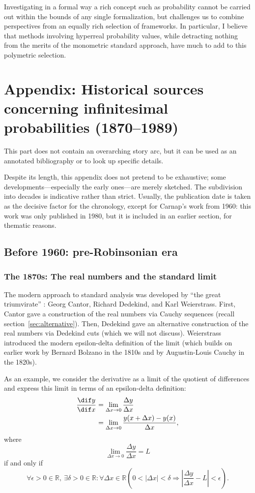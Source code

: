 Investigating in a formal way a rich concept such as probability cannot be carried out within the bounds of any single formalization, but challenges us to combine perspectives from an equally rich selection of frameworks. In particular, I believe that methods involving hyperreal probability values, while detracting nothing from the merits of the monometric standard approach, have much to add to this polymetric selection.


\section[Appendix: Historical Sources]{Appendix: Historical sources concerning infinitesimal probabilities (1870--1989)}
This part does not contain an overarching story arc, but it can be used as an annotated bibliography or to look up specific details.

Despite its length, this appendix does not pretend to be exhaustive; some developments---especially the early ones---are merely sketched.
The subdivision into decades is indicative rather than strict. Usually, the publication date is taken as the decisive factor for the chronology, except for Carnap's work from 1960: this work was only published in 1980, but it is included in an earlier section, for thematic reasons.

\subsection{Before 1960: pre-Robinsonian era}

\subsubsection*{The 1870s: The real numbers and the standard limit}\label{sec:standardcalc}
The modern approach to standard analysis was developed by ``the great triumvirate'' \citep[p.~298]{Boyer:1949}: Georg Cantor, Richard Dedekind, and Karl Weierstrass. First, Cantor gave a construction of the real numbers via Cauchy sequences (recall section~\ref{sec:alternative}). Then, Dedekind gave an alternative construction of the real numbers via Dedekind cuts (which we will not discuss). Weierstrass introduced the modern epsilon-delta definition of the limit (which builds on earlier work by Bernard Bolzano in the 1810s and by Augustin-Louis Cauchy in the 1820s).

As an example, we consider the derivative as a limit of the quotient of differences and express this limit in terms of an epsilon-delta definition:
\begin{align*}
\frac{\dif y}{\dif x} &= \lim_{\Delta x\rightarrow0} \frac{\Delta y}{\Delta x}\\
 &= \lim_{\Delta x\rightarrow0} \frac{y(x+\Delta x) - y(x)}{\Delta x},
\end{align*}
where
$$\lim_{\Delta x\rightarrow0} \frac{\Delta y}{\Delta x} = L$$
if and only if
$$\forall \epsilon > 0 \in \mathbb{R}, \ \exists \delta > 0 \in \mathbb{R}: \forall \Delta x \in \mathbb{R} \left( 0 < |\Delta x| < \delta \Rightarrow | \frac{\Delta y}{\Delta x} - L| < \epsilon \right).$$

